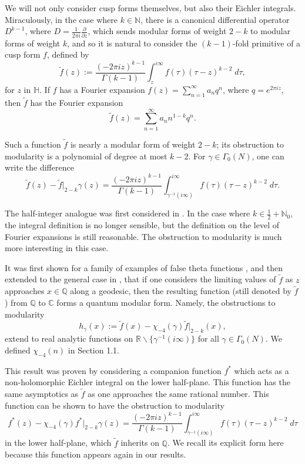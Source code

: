 \documentclass[12pt]{amsart}
\theoremstyle{definition}
\theoremstyle{plain}
\numberwithin{equation}{section}
\begin{document}
We will not only consider cusp forms themselves, but also their Eichler integrals. Miraculously, in the case where $k \in \mathbb{N}$, there is a canonical differential operator $D^{k-1}$, where $D = \frac{1}{2\pi i }\frac{\partial}{\partial z}$,  which sends modular forms of weight $2-k$ to modular forms of weight $k$, and so it is natural to consider the $(k-1)$-fold primitive of a cusp form $f$, defined by \[\tilde{f}(z) := \frac{(-2\pi i z)^{k-1}}{\Gamma(k-1)}\int_z^{i\infty} f(\tau) (\tau-z)^{k-2}\;d\tau,\] for $z$ in $\mathbb{H}$. If $f$ has a Fourier expansion
$f(z) = \sum_{n=1}^\infty a_n q^n$, where $q =e^{2\pi i z}$,  then $\tilde{f}$ has the Fourier expansion 
\begin{equation}\tilde{f}(z) = \sum_{n=1}^\infty a_n n^{1-k} q^n. \label{eqn: eichler} \end{equation} 

Such a function $\tilde{f}$ is nearly a modular form of weight $2-k$; its obstruction to modularity is a polynomial of degree at most $k-2$. 
For $\gamma \in \Gamma_0(N)$, one can write the difference
\[\tilde{f} (z) - \tilde{f}|_{2-k}\gamma(z)=\frac{(-2\pi i z)^{k-1}}{\Gamma(k-1)}\int_{\gamma^{-1}(i\infty)}^{i\infty} f(\tau) (\tau - z)^{k-2}\;d\tau.\]

The half-integer analogue was first considered in \cite{lawrence-zagier}. In the case where $k \in \frac{1}{2}+\mathbb{N}_0$, the integral definition is no longer sensible, but the definition on the level of Fourier expansions is still reasonable. The obstruction to modularity is much more interesting in this case. 

It was first shown for a family of examples of false theta functions \cite{lawrence-zagier}, and then extended to the general case in \cite{bringmann-rolen}, that if one considers the limiting values of $\tilde{f}$ as  $z$ approaches  $x \in \mathbb{Q}$ along a geodesic, then the resulting function (still denoted by $\tilde{f}$) from $\mathbb{Q}$ to $\mathbb{C}$ forms a quantum modular form.  Namely, the obstructions to modularity
\[h_\gamma(x) := \tilde{f}(x) - \chi_{-4}(\gamma)\tilde{f}|_{2-k}(x),
\]
extend to real analytic functions on $\mathbb{R}\backslash \{\gamma^{-1}(i\infty)\}$ for all $\gamma \in \Gamma_0(N)$. We defined $\chi_{-4}(n)$ in Section 1.1.

This result was proven by considering a companion function $f^*$ which acts as a non-holomorphic Eichler integral on the lower half-plane. This function has the same asymptotics as $\tilde{f}$ as one approaches the same rational number. This function can be shown to have the obstruction to modularity 
\[f^*(z) - \chi_{-4}(\gamma) f^*|_{2-k}\gamma(z) = \frac{(-2\pi i z)^{k-1}}{\Gamma(k-1)}\int_{\gamma^{-1}(i\infty)}^{i\infty} f(\tau) (\tau - z)^{k-2}\;d\tau
\]
in the lower half-plane, which $\tilde{f}$ inherits on $\mathbb{Q}$. We recall its explicit form here because this function appears again in our results. 
\end{document}
